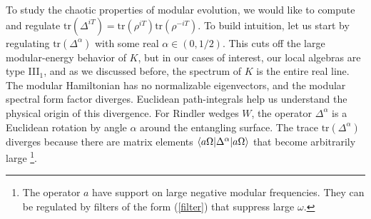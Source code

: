 \documentclass[a4paper,11pt]{article}
\theoremstyle{definition}
\newcommand{\mA}{\mathcal{A}}
\newcommand{\tr}{\text{tr}}
\begin{document}
To study the chaotic properties of modular evolution, we would like to compute and regulate $\tr(\Delta^{iT})=\tr(\rho^{iT})\tr(\rho^{-iT})$. To build intuition, let us start by regulating $\tr(\Delta^\alpha)$ with some real $\alpha\in(0,1/2)$. This cuts off the large modular-energy behavior of $K$, but in our cases of interest, our local algebras are type III$_1$, and as we discussed before, the spectrum of $K$ is the entire real line. The modular Hamiltonian has no normalizable eigenvectors, and the modular spectral form factor diverges. Euclidean path-integrals help us understand the physical origin of this divergence. For Rindler wedges $W$, the operator $\Delta^\alpha$ is a Euclidean rotation by angle $\alpha$ around the entangling surface. The trace $\tr(\Delta^\alpha)$ diverges because there are matrix elements $\braket{a\Omega|\Delta^\alpha |a\Omega}$ that become arbitrarily large \footnote{The operator $a$ have support on large negative modular frequencies. They can be regulated by filters of the form (\ref{filter}) that suppress large $\omega$.}.
\end{document}
